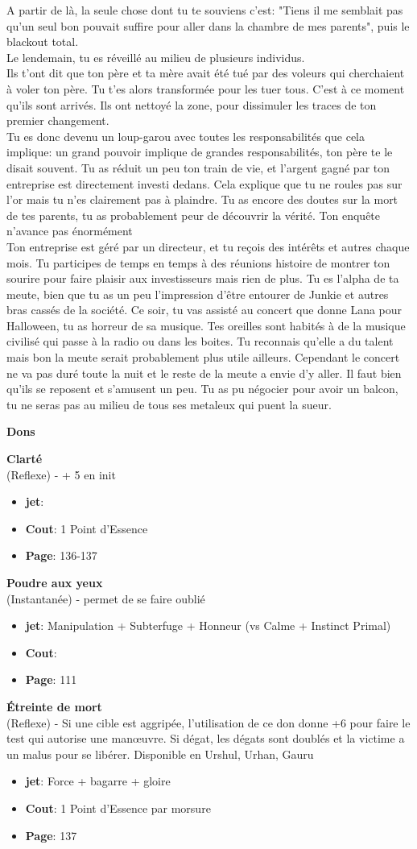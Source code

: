\documentclass[oneside,12pt]{book}
\newcommand\don[6]{
\textbf{#1} \\
(#6) - #2
\begin{itemize}
\item{ \textbf{jet}: #3}
\item{ \textbf{Cout}: #4}
\item{ \textbf{Page}: #5}
\end{itemize}
\vspace{0.5cm}
}
\begin{document}
\begin{flushleft}
\begin{description}
{    A partir de là, la seule chose dont tu te souviens c'est: "Tiens il me semblait pas qu'un seul bon pouvait suffire pour aller dans la chambre de mes parents", puis le blackout total.\\
    Le lendemain, tu es réveillé au milieu de plusieurs individus. \\
    Ils t'ont dit que ton père et ta mère avait été tué par des voleurs qui cherchaient à voler ton père. Tu t'es alors transformée pour les tuer tous. C'est à ce moment qu'ils sont arrivés. Ils ont nettoyé la zone, pour dissimuler les traces de ton premier changement.  \\
    Tu es donc devenu un loup-garou avec toutes les responsabilités que cela implique: un grand pouvoir implique de grandes responsabilités, ton père te le disait souvent. Tu as réduit un peu ton train de vie, et l'argent gagné par ton entreprise est directement investi dedans. Cela explique que tu ne roules pas sur l'or mais tu n'es clairement pas à plaindre. Tu as encore des doutes sur la mort de tes parents, tu as probablement peur de découvrir la vérité. Ton enquête n'avance pas énormément\\
    Ton entreprise est géré par un directeur, et tu reçois des intérêts et autres chaque mois. Tu participes de temps en temps à des réunions histoire de montrer ton sourire pour faire plaisir aux investisseurs mais rien de plus. 
    Tu es l'alpha de ta meute, bien que tu as un peu l'impression d'être entourer de Junkie et autres bras cassés de la société. Ce soir, tu vas assisté au concert que donne Lana pour Halloween, tu as horreur de sa musique. 
    Tes oreilles sont habités à de la musique civilisé qui passe à la radio ou dans les boites. Tu reconnais qu'elle a du talent mais bon la meute serait probablement plus utile ailleurs. Cependant le concert ne va pas duré toute la nuit et le reste de la meute a envie d'y aller. 
    Il faut bien qu'ils se reposent et s'amusent un peu. Tu as pu négocier pour avoir un balcon, tu ne seras pas au milieu de tous ses metaleux qui puent la sueur.  
 }
\end{description}
\clearpage
\textbf{\large Dons} 
\vspace{0.5cm}

\don{Clarté}{+ 5 en init}{}{1 Point d'Essence}{136-137}{Reflexe}
\don{Poudre aux yeux}{permet de se faire oublié}{Manipulation + Subterfuge + Honneur (vs Calme + Instinct Primal)}{}{111}{Instantanée}
\don{Étreinte de mort}{Si une cible est aggripée, l'utilisation de ce don donne +6 pour faire le test qui autorise une manœuvre. Si dégat, les dégats sont doublés et la victime a un malus pour se libérer. Disponible en Urshul, Urhan, Gauru}{Force + bagarre + gloire}{1 Point d'Essence par morsure}{137}{Reflexe}





\end{flushleft}
\end{document}
